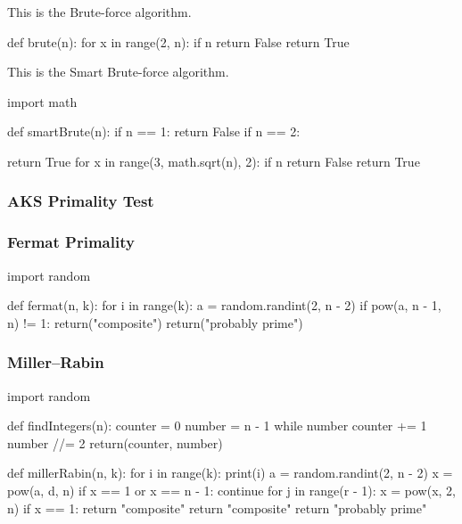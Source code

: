 \documentclass[main.tex]{subfiles}
\begin{document}
This is the Brute-force algorithm.

\begin{python}
    def brute(n):
        for x in range(2, n):
            if n %
                return False
        return True
\end{python}

\vspace{10mm}

This is the Smart Brute-force algorithm.

\begin{python}
    import math

    def smartBrute(n):
        if n == 1:
            return False
        if n == 2:

            return True
        for x in range(3, math.sqrt(n), 2):
            if n %
                return False
        return True
\end{python}

\subsubsection{AKS Primality Test}

\subsubsection{Fermat Primality}

\begin{python}
    import random


    def fermat(n, k):
        for i in range(k):
            a = random.randint(2, n - 2)
            if pow(a, n - 1, n) != 1:
                return("composite")
            return("probably prime")
\end{python}

\subsubsection{Miller–Rabin}

\begin{python}
    import random


    def findIntegers(n):
        counter = 0
        number = n - 1
        while number %
            counter += 1
            number //= 2
        return(counter, number)


    def millerRabin(n, k):
        for i in range(k):
            print(i)
            a = random.randint(2, n - 2)
            x = pow(a, d, n)
            if x == 1 or x == n - 1:
                continue
            for j in range(r - 1):
                x = pow(x, 2, n)
                if x == 1:
                    return "composite"
            return "composite"
        return "probably prime"
\end{python}
\end{document}
